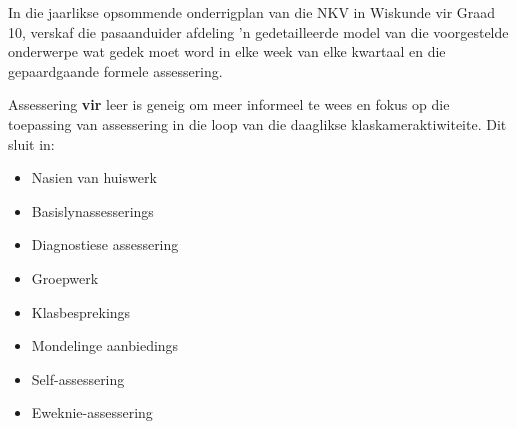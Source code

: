 In die jaarlikse opsommende onderrigplan van die NKV in Wiskunde vir Graad 10, verskaf die pasaanduider afdeling 'n gedetailleerde model van die voorgestelde onderwerpe wat gedek moet word in elke week van elke kwartaal en die gepaardgaande formele assessering. \par

Assessering \textbf{vir} leer is geneig om meer informeel te wees en fokus op die toepassing van assessering in die loop van die daaglikse klaskameraktiwiteite. Dit sluit in:
\begin{itemize}[noitemsep]
\item
Nasien van huiswerk
\item
Basislynassesserings
\item
Diagnostiese assessering
\item
Groepwerk
\item
Klasbesprekings
\item
Mondelinge aanbiedings
\item
Self-assessering
\item
Eweknie-assessering
\end{itemize}


